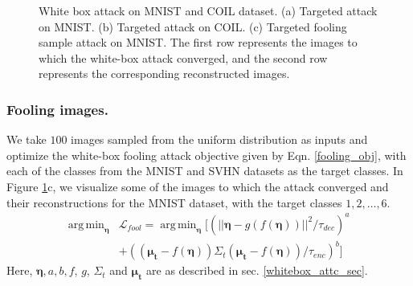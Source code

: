 \documentclass[letterpaper]{article} %
\DeclareMathOperator*{\argmin}{arg\,min}
\begin{document}
\begin{figure}
\begin{tabular}{ccc}
    \end{tabular}
  \caption{White box attack on MNIST and COIL dataset. (a) Targeted attack on MNIST. (b) Targeted attack on COIL. (c) Targeted fooling sample attack on MNIST. The first row represents the images to which the white-box attack converged, and the second row represents the corresponding reconstructed images.}
  \label{fooling_and_adv_samples}
\end{figure}

\subsubsection{Fooling images.}
We take $100$ images sampled from the uniform distribution as inputs and optimize the white-box fooling attack objective given by Eqn. \ref{fooling_obj}, with each of the classes from the MNIST and SVHN datasets as the target classes. In Figure \ref{fooling_and_adv_samples}c, we visualize some of the images to which the attack converged and their reconstructions for the MNIST dataset, with the target classes $1, 2, \dots, 6$.
\begin{equation}
\begin{split}
\argmin_{\boldsymbol{\eta}}&{\mathcal{L}_{fool}} = \argmin_{\boldsymbol{\eta}}[(||\boldsymbol{\eta} - g(f(\boldsymbol{\eta}))||^2/\tau_{dec})^a \\
&+ ((\boldsymbol{\mu_t} - f(\boldsymbol{\eta}))\Sigma_t(\boldsymbol{\mu_t} - f(\boldsymbol{\eta}))/\tau_{enc})^b]
\label{fooling_obj}
\end{split}
\end{equation}
Here, $\boldsymbol{\eta}, a, b, f$, $g$, $\Sigma_t$ and $\boldsymbol{\mu_t}$ are as described in sec. \ref{whitebox_attc_sec}. 
\end{document}
